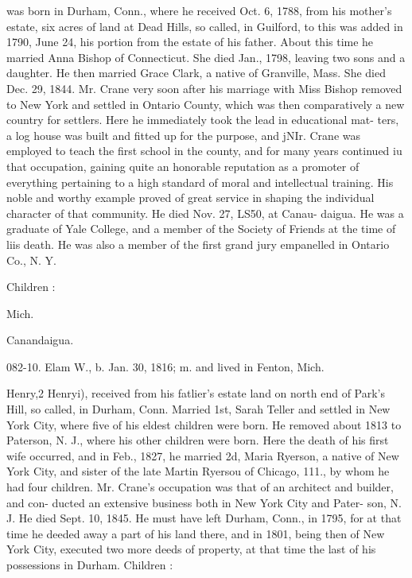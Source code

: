 \documentclass{book}
\begin{document}
was born in Durham, Conn., where he received Oct. 6, 1788, from 
his mother's estate, six acres of land at Dead Hills, so called, in 
Guilford, to this was added in 1790, June 24, his portion from 
the estate of his father. About this time he married Anna Bishop 
of Connecticut. She died Jan., 1798, leaving two sons and a 
daughter. He then married Grace Clark, a native of Granville, 
Mass. She died Dec. 29, 1844. Mr. Crane very soon after his 
marriage with Miss Bishop removed to New York and settled in 
Ontario County, which was then comparatively a new country for 
settlers. Here he immediately took the lead in educational mat- 
ters, a log house was built and fitted up for the purpose, and jNIr. 
Crane was employed to teach the first school in the county, and 
for many years continued iu that occupation, gaining quite an 
honorable reputation as a promoter of everything pertaining to a 
high standard of moral and intellectual training. His noble and 
worthy example proved of great service in shaping the individual 
character of that community. He died Nov. 27, LS50, at Canau- 
daigua. He was a graduate of Yale College, and a member of 
the Society of Friends at the time of liis death. He was also a 
member of the first grand jury empanelled in Ontario Co., N. Y. 

Children : 


Mich. 


Canandaigua. 









082-10. Elam W., b. Jan. 30, 1816; m. and lived in Fenton, Mich. 



Henry,2 Henryi), received from his fatlier's estate land on north 
end of Park's Hill, so called, in Durham, Conn. Married 1st, 
Sarah Teller and settled in New York City, where five of his 
eldest children were born. He removed about 1813 to Paterson, 
N. J., where his other children were born. Here the death of 
his first wife occurred, and in Feb., 1827, he married 2d, Maria 
Ryerson, a native of New York City, and sister of the late Martin 
Ryersou of Chicago, 111., by whom he had four children. Mr. 
Crane's occupation was that of an architect and builder, and con- 
ducted an extensive business both in New York City and Pater- 
son, N. J. He died Sept. 10, 1845. He must have left Durham, 
Conn., in 1795, for at that time he deeded away a part of his land 
there, and in 1801, being then of New York City, executed two 
more deeds of property, at that time the last of his possessions in 
Durham. Children : 
\end{document}
